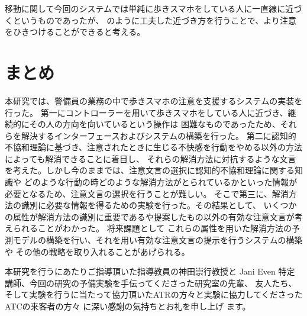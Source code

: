 \documentclass{kuisthesis}
\begin{document}
移動に関して今回のシステムでは単純に歩きスマホをしている人に一直線に近づくというものであったが、
\cite{Mizumaru2019}のように工夫した近づき方を行うことで、より注意をひきつけることができると考える。




\section{まとめ}
本研究では、警備員の業務の中で歩きスマホの注意を支援するシステムの実装を行った。
第一にコントローラーを用いて歩きスマホをしている人に近づき、継続的にその人の方向を向いているという操作は
困難なものであったため、それらを解決するインターフェースおよびシステムの構築を行った。
第二に認知的不協和理論に基づき、注意されたときに生じる不快感を行動をやめる以外の方法によっても解消できることに着目し、
それらの解消方法に対抗するような文言を考えた。しかし今のままでは、注意文言の選択に認知的不協和理論に関する知識や
どのような行動の時どのような解消方法がとられているかといった情報が必要となるため、注意文言の選択を行うことが難しい。
そこで第三に、解消方法の識別に必要な情報を得るための実験を行った。その結果として、
いくつかの属性が解消方法の識別に重要であるや提案したもの以外の有効な注意文言が考えられることがわかった。
将来課題として
これらの属性を用いた解消方法の予測モデルの構築を行い、それを用い有効な注意文言の提示を行うシステムの構築や
その他の戦略を取り入れることがあげられる。

\acknowledgments %
本研究を行うにあたりご指導頂いた指導教員の神田崇行教授と Jani Even
特定講師、今回の研究の予備実験を手伝ってくださった研究室の先輩、
友人たち、そして実験を行うに当たって協力頂いたATRの方々と実験に協力してくださったATCの来客者の方々
に深い感謝の気持ちとお礼を申し上げ
ます。

\nocite{*}
\end{document}
